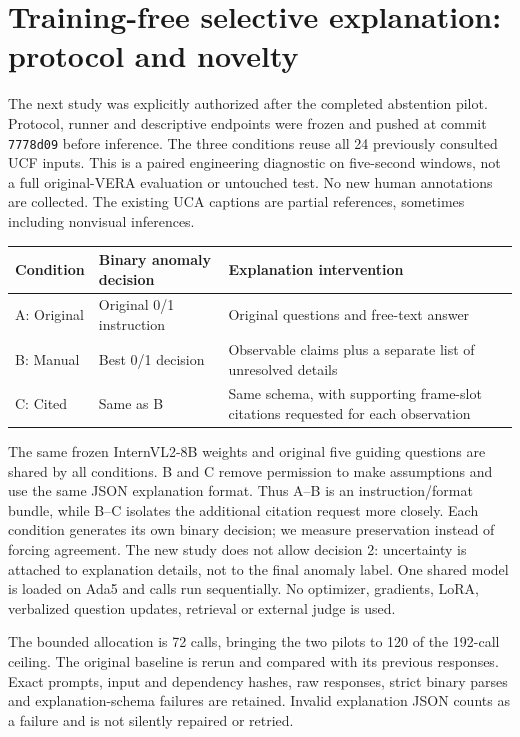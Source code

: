 \section{Training-free selective explanation: protocol and novelty}
The next study was explicitly authorized after the completed abstention pilot. Protocol, runner and descriptive endpoints were frozen and pushed at commit \texttt{7778d09} before inference. The three conditions reuse all 24 previously consulted UCF inputs. This is a paired engineering diagnostic on five-second windows, not a full original-VERA evaluation or untouched test. No new human annotations are collected. The existing UCA captions are partial references, sometimes including nonvisual inferences.

\begin{center}\begin{tabularx}{\linewidth}{lXX}\toprule
Condition & Binary anomaly decision & Explanation intervention\\\midrule
A: Original & Original 0/1 instruction & Original questions and free-text answer\\
B: Manual & Best 0/1 decision & Observable claims plus a separate list of unresolved details\\
C: Cited & Same as B & Same schema, with supporting frame-slot citations requested for each observation\\\bottomrule
\end{tabularx}\end{center}

The same frozen InternVL2-8B weights and original five guiding questions are shared by all conditions. B and C remove permission to make assumptions and use the same JSON explanation format. Thus A--B is an instruction/format bundle, while B--C isolates the additional citation request more closely. Each condition generates its own binary decision; we measure preservation instead of forcing agreement. The new study does not allow decision 2: uncertainty is attached to explanation details, not to the final anomaly label. One shared model is loaded on Ada5 and calls run sequentially. No optimizer, gradients, LoRA, verbalized question updates, retrieval or external judge is used.

The bounded allocation is 72 calls, bringing the two pilots to 120 of the 192-call ceiling. The original baseline is rerun and compared with its previous responses. Exact prompts, input and dependency hashes, raw responses, strict binary parses and explanation-schema failures are retained. Invalid explanation JSON counts as a failure and is not silently repaired or retried.

